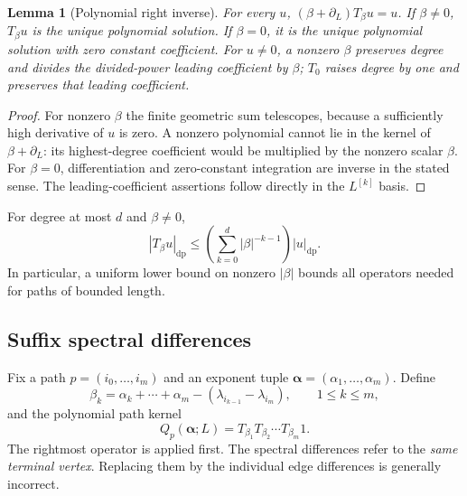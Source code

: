 \documentclass[11pt,a4paper]{article}
\numberwithin{equation}{section}
\newtheorem{lemma}[theorem]{Lemma}
\theoremstyle{definition}
\theoremstyle{remark}
\newcommand{\dplog}[1]{L^{[#1]}}
\begin{document}
\begin{lemma}[Polynomial right inverse]\label{lem:T}
For every $u$, $(\beta+\partial_L)T_\beta u=u$.
If $\beta\ne0$, $T_\beta u$ is the unique polynomial solution. If
$\beta=0$, it is the unique polynomial solution with zero constant
coefficient. For $u\ne0$, a nonzero $\beta$ preserves degree and divides
the divided-power leading coefficient by $\beta$; $T_0$ raises degree by
one and preserves that leading coefficient.
\end{lemma}
\begin{proof}
For nonzero $\beta$ the finite geometric sum telescopes, because a
sufficiently high derivative of $u$ is zero. A nonzero polynomial cannot
lie in the kernel of $\beta+\partial_L$: its highest-degree coefficient
would be multiplied by the nonzero scalar $\beta$. For $\beta=0$,
differentiation and zero-constant integration are inverse in the stated
sense. The leading-coefficient assertions follow directly in the
$\dplog{k}$ basis.
\end{proof}

For degree at most $d$ and $\beta\ne0$,
\begin{equation}\label{eq:Tbound}
 |T_\beta u|_{\mathrm{dp}}
 \leq\left(\sum_{k=0}^d|\beta|^{-k-1}\right)|u|_{\mathrm{dp}}.
\end{equation}
In particular, a uniform lower bound on nonzero $|\beta|$ bounds all
operators needed for paths of bounded length.

\subsection{Suffix spectral differences}
Fix a path $p=(i_0,\ldots,i_m)$ and an exponent tuple
$\boldsymbol\alpha=(\alpha_1,\ldots,\alpha_m)$. Define
\begin{equation}\label{eq:betas}
 \beta_k=\alpha_k+\cdots+\alpha_m
               -(\lambda_{i_{k-1}}-\lambda_{i_m}),
 \qquad 1\leq k\leq m,
\end{equation}
and the polynomial path kernel
\begin{equation}\label{eq:kernel}
 Q_p(\boldsymbol\alpha;L)
       =T_{\beta_1}T_{\beta_2}\cdots T_{\beta_m}1.
\end{equation}
The rightmost operator is applied first. The spectral differences refer
to the \emph{same terminal vertex}. Replacing them by the individual edge
differences is generally incorrect.
\end{document}
